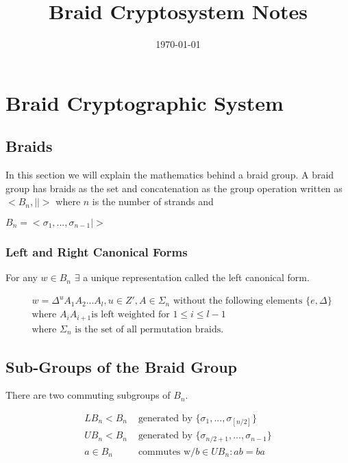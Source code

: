 \documentclass{article}
\title{Braid Cryptosystem Notes}
\date{\today}
\begin{document}
	\maketitle
	
	\section{Braid Cryptographic System}
	
	\subsection{Braids}
	In this section we will explain the mathematics behind a braid group. A braid group has braids as the set and concatenation as the group operation written as $<B_n,||>$ where $n$ is the number of strands and 

	$B_n=<\sigma_1,...,\sigma_{n-1} | >$ 
	
	
	\subsubsection{Left and Right Canonical Forms}
	
	For any $w \in B_n$ $\exists$ a unique representation called the left canonical form.
	
	\begin{align*}
		&w = \Delta^u A_1 A_2 ... A_l, u \in Z', A \in \Sigma_n \text{ without the following elements } \{ e, \Delta \} \\
		&\text{where } A_i A_{i+1} \text{is left weighted for } 1 \leq i \leq l - 1 \\
		&\text{where } \Sigma_n \text{ is the set of all permutation braids.}
	\end{align*}
	
	\subsection{Sub-Groups of the Braid Group}
	There are two commuting subgroups of $B_n$.
	
	\begin{align*}
		LB_n < B_n & \text{ generated by } \{ \sigma_1 , ..., \sigma_{ \left[ n/2 \right] } \}  \\
		UB_n < B_n & \text{ generated by } \{ \sigma_{ n/2 + 1 }, ..., \sigma_{n-1} \} \\
		a \in B_n & \text{ commutes w/} b \in UB_n : ab = ba 
	\end{align*}
	
\end{document}
